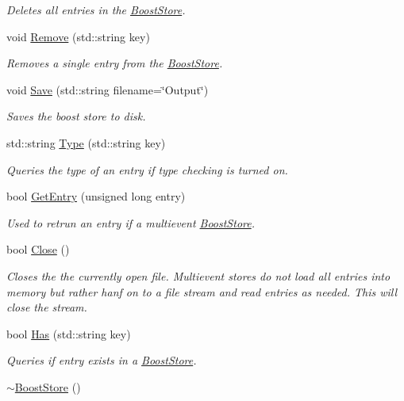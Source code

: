\begin{DoxyCompactItemize}
\begin{DoxyCompactList}\small\item\em Deletes all entries in the \hyperlink{classBoostStore}{Boost\-Store}. \end{DoxyCompactList}\item 
void \hyperlink{classBoostStore_a649b15bdd2710f3caa464f2ffd443101}{Remove} (std\-::string key)
\begin{DoxyCompactList}\small\item\em Removes a single entry from the \hyperlink{classBoostStore}{Boost\-Store}. \end{DoxyCompactList}\item 
void \hyperlink{classBoostStore_a96d434b12fa4084fa1cde1ebdf632c25}{Save} (std\-::string filename=\char`\"{}Output\char`\"{})
\begin{DoxyCompactList}\small\item\em Saves the boost store to disk. \end{DoxyCompactList}\item 
std\-::string \hyperlink{classBoostStore_a50fb58e713af0920daed1be64fd7e23c}{Type} (std\-::string key)
\begin{DoxyCompactList}\small\item\em Queries the type of an entry if type checking is turned on. \end{DoxyCompactList}\item 
bool \hyperlink{classBoostStore_ac2b2fd2169368f715d6d158140d69f0a}{Get\-Entry} (unsigned long entry)
\begin{DoxyCompactList}\small\item\em Used to retrun an entry if a multievent \hyperlink{classBoostStore}{Boost\-Store}. \end{DoxyCompactList}\item 
bool \hyperlink{classBoostStore_a0532c6a62cd78cbd970b46d4212ff9e9}{Close} ()
\begin{DoxyCompactList}\small\item\em Closes the the currently open file. Multievent stores do not load all entries into memory but rather hanf on to a file stream and read entries as needed. This will close the stream. \end{DoxyCompactList}\item 
bool \hyperlink{classBoostStore_af762995f2dbc5404ec1de24c34aea1ff}{Has} (std\-::string key)
\begin{DoxyCompactList}\small\item\em Queries if entry exists in a \hyperlink{classBoostStore}{Boost\-Store}. \end{DoxyCompactList}\item 
\hypertarget{classBoostStore_ad84f44892b8f1a48f1655a399c6809fd}{\hyperlink{classBoostStore_ad84f44892b8f1a48f1655a399c6809fd}{$\sim$\-Boost\-Store} ()}\label{classBoostStore_ad84f44892b8f1a48f1655a399c6809fd}


\end{DoxyCompactItemize}
